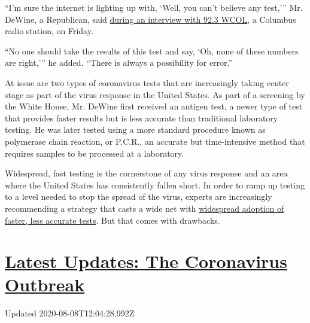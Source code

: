 ``I'm sure the internet is lighting up with, `Well, you can't believe
any test,''' Mr. DeWine, a Republican, said
\href{https://www.iheart.com/podcast/433-woody-the-wake-up-call-28200119/episode/governor-mike-dewine-talks-about-his-69800541/?autoplay=true}{during
an interview with 92.3 WCOL}, a Columbus radio station, on Friday.

``No one should take the results of this test and say, `Oh, none of
these numbers are right,''' he added. ``There is always a possibility
for error.''

At issue are two types of coronavirus tests that are increasingly taking
center stage as part of the virus response in the United States. As part
of a screening by the White House, Mr. DeWine first received an antigen
test, a newer type of test that provides faster results but is less
accurate than traditional laboratory testing. He was later tested using
a more standard procedure known as polymerase chain reaction, or P.C.R.,
an accurate but time-intensive method that requires samples to be
processed at a laboratory.

Widespread, fast testing is the cornerstone of any virus response and an
area where the United States has consistently fallen short. In order to
ramp up testing to a level needed to stop the spread of the virus,
experts are increasingly recommending a strategy that casts a wide net
with
\href{https://www.nytimes.com/2020/08/06/health/rapid-Covid-tests.html}{widespread
adoption of faster, less accurate tests}. But that comes with drawbacks.

\hypertarget{latest-updates-the-coronavirus-outbreak}{%
\section{\texorpdfstring{\href{https://www.nytimes.com/2020/08/07/world/covid-19-news.html?action=click\&pgtype=Article\&state=default\&region=MAIN_CONTENT_1\&context=storylines_live_updates}{Latest
Updates: The Coronavirus
Outbreak}}{Latest Updates: The Coronavirus Outbreak}}\label{latest-updates-the-coronavirus-outbreak}}

Updated 2020-08-08T12:04:28.992Z

